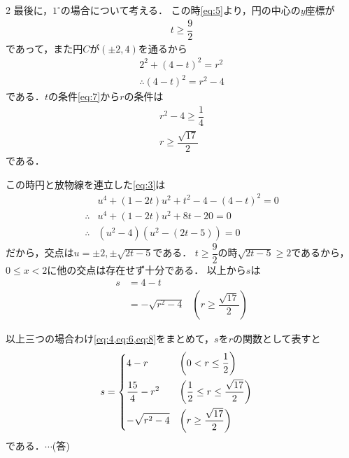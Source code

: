 \documentclass[../../main.tex]{subfiles}
\begin{document}
\begin{multicols}{2}
  最後に，$1^{\circ}$の場合について考える．
  この時\cref{eq:5}より，円の中心の$y$座標が
  \begin{align}
    t \ge \dfrac{9}{2} \label{eq:7}
  \end{align}
  であって，また円$C$が$(\pm2, 4)$を通るから
  \begin{align}
    2^2 + (4-t)^2 = r^2 \\
    \therefore
    (4-t)^2 = r^2 -4
  \end{align}
  である．$t$の条件\cref{eq:7}から$r$の条件は
  \begin{align}
    r^2 -4 \ge \dfrac{1}{4} \\
    r \ge \dfrac{\sqrt{17}}{2}
  \end{align}
  である．

  この時円と放物線を連立した\cref{eq:3}は
  \begin{align}
    & u^4 + (1-2t)u^2 + t^2 -4 - (4-t)^2 = 0 \\
    \therefore
    & u^4 + (1-2t)u^2 + 8t -20 = 0           \\
    \therefore
    & (u^2-4)\left(u^2 - (2t-5)\right) = 0
  \end{align}
  だから，交点は$u=\pm 2, \pm\sqrt{2t-5}$である．
  $t \ge \dfrac{9}{2}$の時$\sqrt{2t-5}\ge 2$であるから，$0\le x <2$に他の交点は存在せず十分である．
  以上から$s$は
  \begin{align}
    s
    & = 4 - t                                                                      \\
    & = - \sqrt{r^2-4} & \left(r \ge \dfrac{\sqrt{17}}{2} \right) \label{eq:8}
  \end{align}

  以上三つの場合わけ\cref{eq:4,eq:6,eq:8}をまとめて，$s$を$r$の関数として表すと
  \begin{align}
    s & =
    \begin{dcases}
      4 - r              & \left(0 < r \le \dfrac{1}{2}\right)                       \\
      \dfrac{15}{4} - r^2 & \left(\dfrac{1}{2} \le  r  \le \dfrac{\sqrt{17}}{2}\right) \\
      - \sqrt{r^2-4}     & \left(r \ge \dfrac{\sqrt{17}}{2} \right)
    \end{dcases}
  \end{align}
  である．$\cdots$(答)


\end{multicols}
\end{document}
